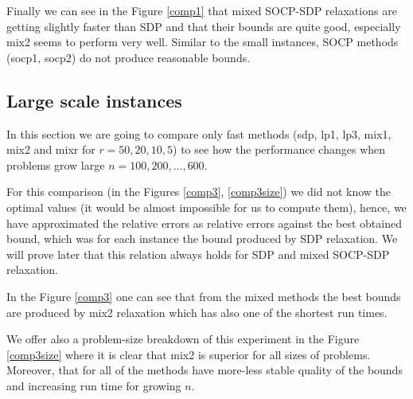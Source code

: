\documentclass[12pt]{book}
\theoremstyle{definition}
\begin{document}
Finally we can see in the Figure \ref{comp1} that mixed SOCP-SDP relaxations are getting slightly faster than SDP and that their bounds are quite good, especially mix2 seems to perform very well. 
Similar to the small instances, SOCP methods (socp1, socp2) do not produce reasonable bounds. 


\subsection{Large scale instances}

In this section we are going to compare only fast methods (sdp, lp1, lp3, mix1, mix2 and  mixr for $r=50,20,10,5$) to see how the performance changes when problems grow large $n=100, 200, \dots ,600$.

For this comparison (in the Figures \ref{comp3}, \ref{comp3size}) we did not know the optimal values (it would be almost impossible for us to compute them), hence, we have approximated the relative errors as relative errors against the best obtained bound, which was for each instance the bound produced by SDP relaxation. We will prove later that this relation always holds for SDP and mixed SOCP-SDP relaxation.

In the Figure \ref{comp3} one can see that from the mixed methods the best bounds are produced by mix2 relaxation which has also one of the shortest run times. 


We offer also a problem-size breakdown of this experiment in the Figure \ref{comp3size} where it is clear that mix2 is superior for all sizes of problems. Moreover, that for all of the methods have more-less stable quality of the bounds and increasing run time for growing $n$.


 
\end{document}
